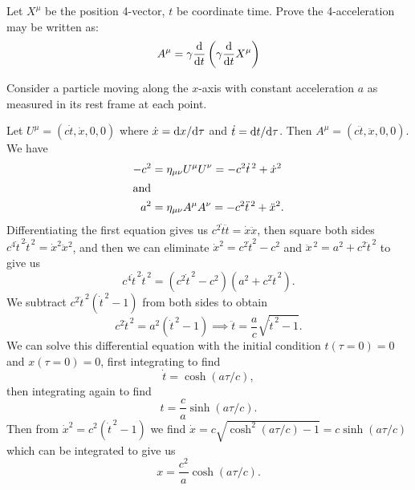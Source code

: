 \begin{exercise}
Let $X^{\mu}$ be the position 4-vector, $t$ be coordinate time. Prove
the 4-acceleration may be written as:
\begin{equation*}
A^{\mu} = \gamma\frac{\mathrm{d}}{\mathrm{d} t}\left(\gamma\frac{\mathrm{d}}{\mathrm{d} t}X^{\mu}\right)
\end{equation*}
\end{exercise}

Consider a particle moving along the $x$-axis with constant acceleration
$a$ as measured in its rest frame at each point.

Let $U^{\mu}=(c\dot{t},\dot{x},0,0)$ where $\dot{x}=\mathrm{d} x/\mathrm{d}\tau$ and
$\dot{t}=\mathrm{d} t/\mathrm{d}\tau$. Then $A^{\mu}=(c\ddot{t},\ddot{x},0,0)$. We have
\begin{subequations}
\begin{align}
-c^{2} &= \eta_{\mu\nu}U^{\mu}U^{\nu} = -c^{2}\dot{t}^{\,2} + \dot{x}^{2}\\
\intertext{and}
a^{2} &= \eta_{\mu\nu}A^{\mu}A^{\nu} = -c^{2}\ddot{t}^{\,2} + \ddot{x}^{2}.
\end{align}
\end{subequations}
Differentiating the first equation gives us $c^{2}\dot{t}\ddot{t}=\dot{x}\ddot{x}$,
then square both sides
$c^{4}\dot{t}^{\,2}\ddot{t}^{\,2}=\dot{x}^{2}\ddot{x}^{2}$, and then
we can eliminate $\dot{x}^{2}=c^{2}\dot{t}^{2}-c^{2}$ and
$\ddot{x}^{\,2}=a^{2}+c^{2}\ddot{t}^{\,2}$ to give us
\begin{equation}
c^{4}\dot{t}^{\,2}\ddot{t}^{\,2}=(c^{2}\dot{t}^{\,2}-c^{2})(a^{2}+c^{2}\ddot{t}^{\,2}).
\end{equation}
We subtract $c^{2}\ddot{t}^{\,2}(\dot{t}^{\,2}-1)$ from both sides to
obtain
\begin{equation}
c^{2}\ddot{t}^{\,2} = a^{2}(\dot{t}^{\,2} - 1)\implies\ddot{t}=\frac{a}{c}\sqrt{\dot{t}^{\,2} - 1}.
\end{equation}
We can solve this differential equation with the initial condition
$t(\tau=0)=0$ and $x(\tau=0)=0$, first integrating to find
\begin{equation}
\dot{t} = \cosh(a\tau/c),
\end{equation}
then integrating again to find
\begin{equation}
t = \frac{c}{a}\sinh(a\tau/c).
\end{equation}
Then from $\dot{x}^{2} = c^{2}(\dot{t}^{\,2}-1)$ we find $\dot{x} = c\sqrt{\cosh^{2}(a\tau/c)-1}=c\sinh(a\tau/c)$
which can be integrated to give us
\begin{equation}
x = \frac{c^{2}}{a}\cosh(a\tau/c).
\end{equation}

